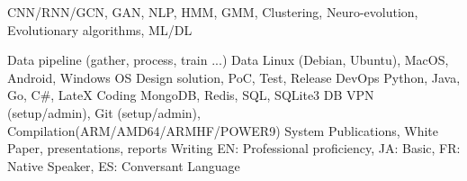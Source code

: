 \begin{cvhonors}
\cvpublication
    {}
    {CNN/RNN/GCN, GAN, NLP, HMM, GMM, Clustering, Neuro-evolution, Evolutionary algorithms,
    }
    {}
    {ML/DL}

\cvpublication
    {}
    {Data pipeline (gather, process, train ...)}
    {}
    {Data}
\cvpublication
    {}
    {Linux (Debian, Ubuntu), MacOS, Android, Windows}
    {}
    {OS}
\cvpublication
    {}
    {Design solution, PoC, Test, Release}
    {}
    {DevOps}
\cvpublication
    {}
    {Python, Java, Go, C\#, LateX}
    {}
    {Coding}
\cvpublication
    {}
    {MongoDB, Redis, SQL, SQLite3}
    {}
    {DB}
\cvpublication
    {}
    {VPN (setup/admin), Git (setup/admin), Compilation(ARM/AMD64/ARMHF/POWER9)}
    {}
    {System}
\cvpublication
    {}
    {Publications, White Paper, presentations, reports}
    {}
    {Writing}
\cvpublication
    {}
    {EN: Professional proficiency, JA: Basic, FR: Native Speaker, ES: Conversant}
    {}
    {Language}
\end{cvhonors}

